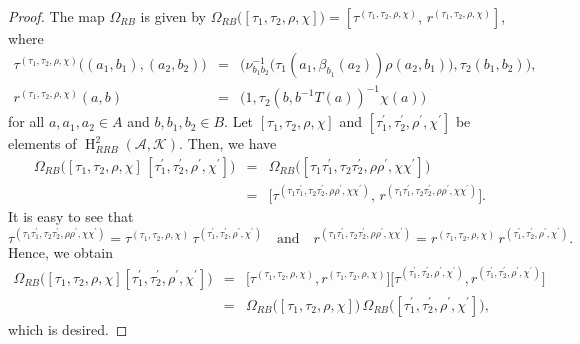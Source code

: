 \documentclass{jonasart}
\theoremstyle{plain}
\DeclareMathOperator{\Ho}{H}
\begin{document}
	\begin{proof}
		The map $\Omega_{RB}$ is given by $\Omega_{RB}\big( [\tau_1, \tau_2, \rho, \chi]\big)= [\tau^{(\tau_1, \tau_2, \rho, \chi)}, \, r^{(\tau_1, \tau_2, \rho, \chi)}]$, where
		\begin{eqnarray*}
			\tau^{(\tau_1, \tau_2, \rho, \chi)} \big((a_1,b_1 ),(a_2,b_2 )\big)&=&\big(\nu^{-1}_{b_1 b_2}\big(\tau_1 (a_1,\beta_{b_1}(a_2 ))\rho(a_2,b_1 )\big),\tau_2 (b_1,b_2 )\big),\\
			r^{(\tau_1, \tau_2, \rho, \chi)}(a,b)&=&\big(1,\tau_2 (b,b^{-1}T(a))^{-1}\chi(a)\big)
		\end{eqnarray*}
		for all $a,a_1,a_2\in A$ and $b,b_1,b_2\in B$. Let $[\tau_1, \tau_2, \rho, \chi]$ and $[\tau^\prime_1, \tau^\prime_2, \rho^\prime, \chi^\prime]$ be elements of $\Ho^2_{RRB}(\mathcal{A}, \mathcal{K})$. Then, we have
		\begin{eqnarray*}
			\Omega_{RB} \big( [\tau_1, \tau_2, \rho, \chi] \, [\tau^\prime_1, \tau^\prime_2, \rho^\prime, \chi^\prime] \big) &=& \Omega_{RB} \big( [\tau_1\tau^\prime_1, \tau_2\tau^\prime_2, \rho \rho^\prime, \chi\chi^\prime]\big)\\
			&=& \big[\tau^{(\tau_1\tau^\prime_1, \tau_2\tau^\prime_2, \rho \rho^\prime, \chi\chi^\prime)},\, r^{(\tau_1\tau^\prime_1, \tau_2\tau^\prime_2, \rho \rho^\prime, \chi\chi^\prime)} \big].
		\end{eqnarray*}
		It is easy to see that
		\[
		\tau^{(\tau_1\tau^\prime_1, \tau_2\tau^\prime_2, \rho \rho^\prime, \chi\chi^\prime)}=	\tau^{(\tau_1, \tau_2, \rho, \chi)} \,	\tau^{(\tau^\prime_1, \tau^\prime_2, \rho^\prime, \chi^\prime)} \quad \textrm{and} \quad r^{(\tau_1\tau^\prime_1, \tau_2\tau^\prime_2, \rho \rho^\prime, \chi\chi^\prime)}=	r^{(\tau_1, \tau_2, \rho, \chi)}\, r^{(\tau^\prime_1, \tau^\prime_2, \rho^\prime, \chi^\prime)}.
		\]
		Hence, we obtain
		\begin{eqnarray*}
			\Omega_{RB} \big( [\tau_1, \tau_2, \rho, \chi] [\tau^\prime_1, \tau^\prime_2, \rho^\prime, \chi^\prime] \big) &=& \big[\tau^{(\tau_1, \tau_2, \rho, \chi)},r^{(\tau_1, \tau_2, \rho, \chi)} \big] \big[\tau^{(\tau^\prime_1, \tau^\prime_2, \rho^\prime, \chi^\prime)},r^{(\tau^\prime_1, \tau^\prime_2, \rho^\prime, \chi^\prime)} \big]\\
			& =& \Omega_{RB} \big( [\tau_1, \tau_2, \rho, \chi] \big) \,	\Omega_{RB} \big([\tau^\prime_1, \tau^\prime_2, \rho^\prime, \chi^\prime] \big),
		\end{eqnarray*}
		which is desired.
	\end{proof}
	
\end{document}
